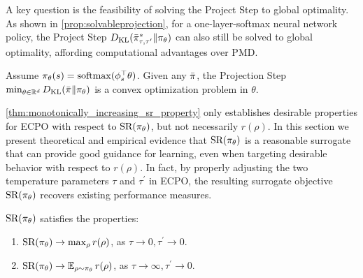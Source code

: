 A key question is the feasibility of solving the
Project Step to global optimality.
As shown in \cref{prop:solvableprojection}, 
for a one-layer-softmax neural network policy,
the Project Step $D_{\mathrm{KL}}( \bar{\pi}_{\tau,\tau^{\prime}}^* \| \pi_\theta)$
can also still be solved to global optimality,
affording computational advantages over PMD.

\begin{prop}
\label{prop:solvableprojection}
Assume $\pi_\theta(s) = \mathrm{softmax}(\phi_s^{\top}\theta)$.
Given any $\bar{\pi}$,
the Projection Step
$\min\nolimits_{\theta \in \mathbb{R}^d}{D_{\mathrm{KL}}(\bar{\pi} \| \pi_\theta)}$
is a convex optimization problem in $\theta$.
\end{prop}


\if
\label{subsec:sr}


\cref{thm:monotonically_increasing_sr_property} only establishes
desirable properties for ECPO with respect to $\text{SR}(\pi_\theta)$,
but not necessarily $r(\rho)$.
In this section we present theoretical and empirical evidence that
$\text{SR}(\pi_\theta)$ is a reasonable surrogate 
that can provide good guidance for learning,
even when targeting desirable behavior with respect to $r(\rho)$.
In fact, by properly adjusting the two temperature parameters $\tau$ and
$\tau^{\prime}$ in ECPO,
the resulting surrogate objective $\text{SR}(\pi_\theta)$
recovers existing performance measures.

\begin{prop}
\label{prop:sr}
$\text{SR}(\pi_\theta)$ satisfies the properties:
\begin{enumerate}[label=(\roman*)]
	\item  $\text{SR}(\pi_\theta) \to \max_{\rho}{r(\rho)}$, as $\tau \to 0, \tau^{\prime} \to 0$.
	\item $\text{SR}(\pi_\theta) \to \operatorname*{\mathbb{E}}_{\rho \sim \pi_\theta}{r(\rho)}$, as $\tau \to \infty, \tau^{\prime} \to 0$. 
\end{enumerate}	
\end{prop}

